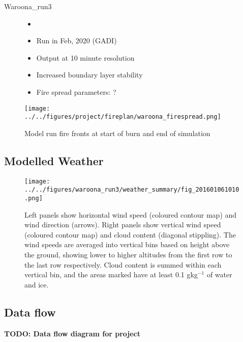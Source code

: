 \begin{description}
      \item [Waroona\_run3]
      \begin{itemize}
        \item []
        \item Run in Feb, 2020 (GADI)
        \item Output at 10 minute resolution
        \item Increased boundary layer stability
        \item Fire spread parameters: ?
      \end{itemize}
    \end{description}
    
    \begin{figure}
      \texttt{[image: ../../figures/project/fireplan/waroona\_firespread.png]}
      \caption{Model run fire fronts at start of burn and end of simulation}
      \label{fig:model:firespread_waroona}
    \end{figure}
    
    
  \subsection{Modelled Weather}
    
    
    \begin{figure}
      \texttt{[image: ../../figures/waroona\_run3/weather\_summary/fig\_201601061010.png]}
      \caption{Left panels show horizontal wind speed (coloured contour map) and wind direction (arrows).
      Right panels show vertical wind speed (coloured contour map) and cloud content (diagonal stippling).
      The wind speeds are averaged into vertical bins based on height above the ground, showing lower to higher altitudes from the first row to the last row respectively.
      Cloud content is summed within each vertical bin, and the areas marked have at least 0.1 gkg$^{-1}$ of water and ice.}
      \label{fig:model:weather_summary_eg}
    \end{figure}
        
  \subsection{Data flow}
    \textbf{TODO: Data flow diagram for project}
